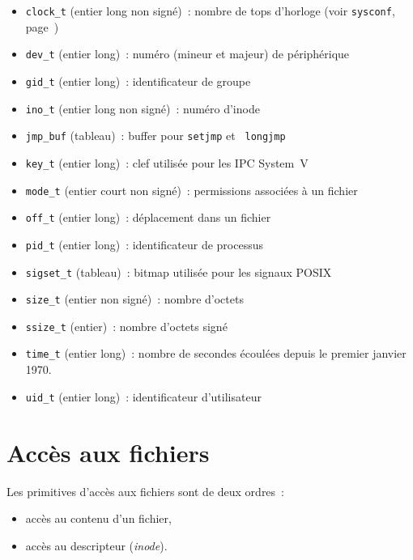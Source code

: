\documentclass [twoside] {report}
\begin{document}
\begin {itemize}
    \item {\tt clock\_t} (entier long non signé)~: nombre de tops
	d'horloge (voir {\tt sysconf}, page~\pageref {sysconf})
    \item {\tt dev\_t} (entier long)~: numéro (mineur et majeur) de
	périphérique
    \item {\tt gid\_t} (entier long)~: identificateur de groupe
    \item {\tt ino\_t} (entier long non signé)~: numéro d'inode
    \item {\tt jmp\_buf} (tableau)~: buffer pour {\tt setjmp} et {\tt
	longjmp}
    \item {\tt key\_t} (entier long)~: clef utilisée pour les IPC System~V
    \item {\tt mode\_t} (entier court non signé)~: permissions associées
	à un fichier
    \item {\tt off\_t} (entier long)~: déplacement dans un fichier
    \item {\tt pid\_t} (entier long)~: identificateur de processus
    \item {\tt sigset\_t} (tableau)~: bitmap utilisée pour les signaux POSIX
    \item {\tt size\_t} (entier non signé)~: nombre d'octets
    \item {\tt ssize\_t} (entier)~: nombre d'octets signé
    \item {\tt time\_t} (entier long)~: nombre de secondes écoulées
	depuis le premier janvier 1970.
    \item {\tt uid\_t} (entier long)~: identificateur d'utilisateur
\end {itemize}




\section {Accès aux fichiers}


Les primitives d'accès aux fichiers sont de deux
ordres~:
\begin {itemize}
    \item accès au contenu d'un fichier,
    \item accès au descripteur ({\it inode}).
\end {itemize}
\end{document}
